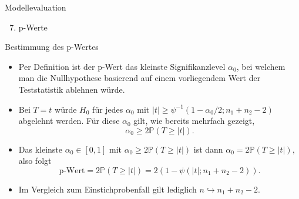 \documentclass[
  8pt,
  ignorenonframetext,
]{beamer}
\providecommand{\tightlist}{%
  \setlength{\itemsep}{0pt}\setlength{\parskip}{0pt}}
\begin{document}
\begin{frame}{Modellevaluation}
\protect\hypertarget{modellevaluation-33}{}
\begin{enumerate}
[(1)]
\setcounter{enumi}{6}
\tightlist
\item
  p-Werte
\end{enumerate}

\small

Bestimmung des p-Wertes \vspace{2mm}

\footnotesize

\begin{itemize}
\item
  \itemsep2mm \justifying \small Per Definition ist der p-Wert das
  kleinste Signifikanzlevel \(\alpha_0\), bei welchem man die
  Nullhypothese basierend auf einem vorliegendem Wert der Teststatistik
  ablehnen würde.
\item
  Bei \(T = t\) würde \(H_0\) für jedes \(\alpha_0\) mit
  \(|t|\ge\psi^{-1}(1-\alpha_0/2; n_1 + n_2-2)\) abgelehnt werden. Für
  diese \(\alpha_0\) gilt, wie bereits mehrfach gezeigt,
  \begin{equation}
  \alpha_0 \ge 2 \mathbb{P}(T \ge |t|).
  \end{equation}
\item
  Das kleinste \(\alpha_0 \in [0,1]\) mit
  \(\alpha_0 \ge 2 \mathbb{P}(T \ge |t|)\) ist dann
  \(\alpha_0 = 2 \mathbb{P}(T \ge |t|)\), also folgt \begin{equation}
  \mbox{p-Wert} =  2 \mathbb{P}(T \ge |t|) = 2(1 - \psi(|t|;n_1 + n_2 - 2)).
  \end{equation}
\item
  Im Vergleich zum Einstichprobenfall gilt lediglich
  \(n \hookrightarrow n_1 + n_2 -2\).
\end{itemize}
\end{frame}
\end{document}
